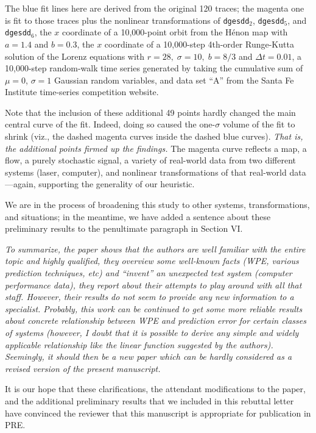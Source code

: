 \documentclass[12pt]{article}
\begin{document}
The blue fit lines here are derived from the original 120 traces; the
magenta one is fit to those traces plus the nonlinear transformations
of {\tt dgesdd}$_2$, {\tt dgesdd}$_5$, and {\tt dgesdd}$_6$, the $x$
coordinate of a 10,000-point orbit from the H\'{e}non map with $a=1.4$
and $b=0.3$, the $x$ coordinate of a 10,000-step 4th-order Runge-Kutta
solution of the Lorenz equations with $r=28, \; \sigma=10, \; b=8/3$
and $\Delta t=0.01$, a 10,000-step random-walk time series generated
by taking the cumulative sum of $\mu=0$, $\sigma=1$ Gaussian random
variables, and data set ``A'' from the Santa Fe Institute time-series
competition website.

Note that the inclusion of these additional 49 points hardly changed
the main central curve of the fit.  Indeed, doing so caused the
one-$\sigma$ volume of the fit to shrink (viz., the dashed magenta
curves inside the dashed blue curves).  \emph{That is, the additional
  points firmed up the findings.}  The magenta curve reflects a map, a
flow, a purely stochastic signal, a variety of real-world data from
two different systems (laser, computer), and nonlinear transformations
of that real-world data---again, supporting the generality of our
heuristic.

We are in the process of broadening this study to other systems,
transformations, and situations; in the meantime, we have added a
sentence about these preliminary results to the penultimate paragraph
in Section VI.

\smallskip

\emph{To summarize, the paper shows that the authors are well familiar
  with the entire topic and highly qualified, they overview some
  well-known facts (WPE, various prediction techniques, etc) and
  ``invent'' an unexpected test system (computer performance data),
  they report about their attempts to play around with all that
  staff. However, their results do not seem to provide any new
  information to a specialist. Probably, this work can be continued to
  get some more reliable results about concrete relationship between
  WPE and prediction error for certain classes of systems (however, I
  doubt that it is possible to derive any simple and widely applicable
  relationship like the linear function suggested by the
  authors). Seemingly, it should then be a new paper which can be
  hardly considered as a revised version of the present manuscript.}

It is our hope that these clarifications, the attendant modifications
to the paper, and the additional preliminary results that we included
in this rebuttal letter have convinced the reviewer that this
manuscript is appropriate for publication in PRE.
\end{document}
